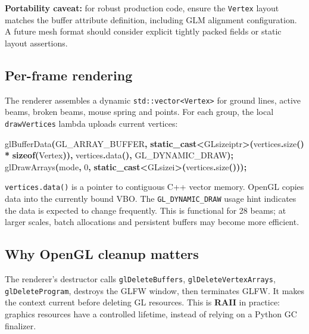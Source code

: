 \documentclass[
  10pt,
  a4paper,
]{article}
\newenvironment{Shaded}{\begin{snugshade}}{\end{snugshade}}
\newcommand{\DecValTok}[1]{\textcolor[rgb]{0.00,0.00,0.81}{#1}}
\newcommand{\KeywordTok}[1]{\textcolor[rgb]{0.13,0.29,0.53}{\textbf{#1}}}
\newcommand{\NormalTok}[1]{#1}
\newcommand{\OperatorTok}[1]{\textcolor[rgb]{0.81,0.36,0.00}{\textbf{#1}}}
\begin{document}
\textbf{Portability caveat:} for robust production code, ensure the
\texttt{Vertex} layout matches the buffer attribute definition,
including GLM alignment configuration. A future mesh format should
consider explicit tightly packed fields or static layout assertions.

\subsection{Per-frame rendering}\label{per-frame-rendering}

The renderer assembles a dynamic
\texttt{std::vector\textless{}Vertex\textgreater{}} for ground lines,
active beams, broken beams, mouse spring and points. For each group, the
local \texttt{drawVertices} lambda uploads current vertices:

\begin{Shaded}
\begin{Highlighting}[]
\NormalTok{glBufferData}\OperatorTok{(}\NormalTok{GL\_ARRAY\_BUFFER}\OperatorTok{,}
    \KeywordTok{static\_cast}\OperatorTok{\textless{}}\NormalTok{GLsizeiptr}\OperatorTok{\textgreater{}(}\NormalTok{vertices}\OperatorTok{.}\NormalTok{size}\OperatorTok{()} \OperatorTok{*} \KeywordTok{sizeof}\OperatorTok{(}\NormalTok{Vertex}\OperatorTok{)),}
\NormalTok{    vertices}\OperatorTok{.}\NormalTok{data}\OperatorTok{(),}\NormalTok{ GL\_DYNAMIC\_DRAW}\OperatorTok{);}
\NormalTok{glDrawArrays}\OperatorTok{(}\NormalTok{mode}\OperatorTok{,} \DecValTok{0}\OperatorTok{,} \KeywordTok{static\_cast}\OperatorTok{\textless{}}\NormalTok{GLsizei}\OperatorTok{\textgreater{}(}\NormalTok{vertices}\OperatorTok{.}\NormalTok{size}\OperatorTok{()));}
\end{Highlighting}
\end{Shaded}

\texttt{vertices.data()} is a pointer to contiguous C++ vector memory.
OpenGL copies data into the currently bound VBO. The
\texttt{GL\_DYNAMIC\_DRAW} usage hint indicates the data is expected to
change frequently. This is functional for 28 beams; at larger scales,
batch allocations and persistent buffers may become more efficient.

\subsection{Why OpenGL cleanup
matters}\label{why-opengl-cleanup-matters}

The renderer's destructor calls \texttt{glDeleteBuffers},
\texttt{glDeleteVertexArrays}, \texttt{glDeleteProgram}, destroys the
GLFW window, then terminates GLFW. It makes the context current before
deleting GL resources. This is \textbf{RAII} in practice: graphics
resources have a controlled lifetime, instead of relying on a Python GC
finalizer.
\end{document}
